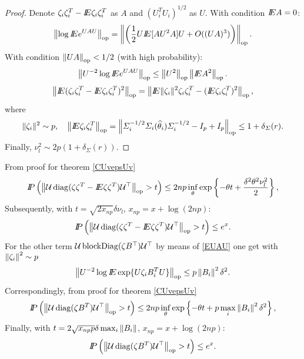 \begin{proof}


Denote $\zeta_i \zeta_i^{T}   -  I\!\!E \zeta_i \zeta_i^{T}$ as $A$ and $(U_i^{T} U_i)^{1/2}$ as $U$. 
With condition $I\!\!E A = 0$:
\[
\left\Vert  \log I\!\!E e^{U A U}   \right\Vert_{\operatorname{op}} = \left\Vert   \left(\frac{1}{2} U I\!\!E[ AU^2A ] U + O((UA)^3) \right)  \right\Vert_{\operatorname{op}}.
\]
With condition $\left\Vert  U A  \right\Vert_{\operatorname{op}} < 1/2 $ (with high probability):
\begin{equation}
\label{EUAU}
\left\Vert  U^{-2} \log I\!\!E e^{U A U}   \right\Vert_{\operatorname{op}}  \leq  \left\Vert U^2 \right\Vert_{\operatorname{op}} \left\Vert I\!\!E A^2 \right\Vert_{\operatorname{op}}.
\end{equation}
\[
\normop{\E (\zeta_i \zeta_i^{T}   -  \E \zeta_i \zeta_i^{T})^2} = 
\normop{\E \Vert \zeta_i \Vert^2  \zeta_i \zeta_i^{T}   -  (\E \zeta_i \zeta_i^{T})^2 },  
\]
where 
\[
\Vert \zeta_i \Vert^2 \sim p,
\quad
\left\Vert I\!\!E  \zeta_i \zeta_i^{T}  \right\Vert_{\operatorname{op}} = \left\Vert 
\varSigma_i^{-1/2} \varSigma_i(\widehat{\theta}_i)  \varSigma_i^{-1/2} - I_p + I_p  
 \right\Vert_{\operatorname{op}}
\leq 1 + \delta_{\varSigma}(r).
\]
Finally, $\nu_l^2  \sim 2 p (1 + \delta_{\Sigma}(r))$.
\end{proof}


From proof for theorem \ref{CUvepsUv} 
\[
I\!\!P \left( \left\Vert \mathcal{U} \operatorname{diag}(\zeta \zeta^{T}   -  I\!\!E \zeta \zeta^{T}) \mathcal{U}^{\top} \right\Vert_{\operatorname{op}} >t \right) \leq
2 np \inf_{\theta} \exp \left \{ -\theta t + \frac{\delta^2 \theta^2  \nu_l^2}{2} \right\},
\]
Subsequently, with $t = \sqrt{2x_{np}} \delta  \nu_l$, $x_{np}  = x + \log (2np)$:
\[
I\!\!P \left( \left\Vert \mathcal{U} \operatorname{diag}(\zeta \zeta^{T}   -  I\!\!E \zeta \zeta^{T}) \mathcal{U}^{\top} \right\Vert_{\operatorname{op}} >t \right) \leq e^{x}.
\]
For the other term $\mathcal{U} \operatorname{blockDiag}(\zeta B^{\top})\mathcal{U}^{\top}$ by means of \ref{EUAU} one get with $\left\Vert \zeta_i \right\Vert^2 \sim p$
\[
\left\Vert  
U^{-2}
\log I\!\!E \exp \{ U  \zeta_i B_i^{T}  U 
\}  \right\Vert_{\operatorname{op}} \leq p \left\Vert B_i \right\Vert^2 \delta^2 .
\]
Correspondingly, from proof for theorem \ref{CUvepsUv} 
\[
I\!\!P \left( \left\Vert \mathcal{U} \operatorname{diag}(\zeta B^{T} ) \mathcal{U}^{\top} \right\Vert_{\operatorname{op}} >t \right) \leq
2 np \inf_{\theta} \exp \left \{ -\theta t + p \max_i \left\Vert B_i \right\Vert^2 \delta^2 \right\},
\]
Finally, with $t =  2 \sqrt{x_{np} p} \delta  \max_i \left\Vert B_i \right\Vert  $, $x_{np}  = x + \log (2np)$:
\[
I\!\!P \left( \left\Vert \mathcal{U} \operatorname{diag}(\zeta B^{T} ) \mathcal{U}^{\top} \right\Vert_{\operatorname{op}} >t \right) \leq e^{x}.
\]




